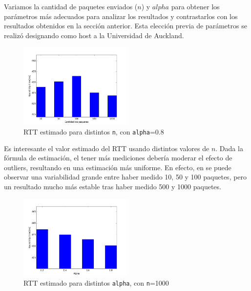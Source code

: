 \documentclass[final,inline,a4paper,narroweqnarray]{ieee}
\begin{document}
Variamos la cantidad de paquetes enviados ($n$) y $alpha$ para obtener los
parámetros más adecuados para analizar los resultados y contrastarlos con los
resultados obtenidos en la sección anterior. Esta elección previa de parámetros
se realizó designando como host a la Universidad de Auckland.

\begin{figure}[ht]\begin{center}
   \includegraphics[width=0.5\textwidth]{imagenes/auckland-estimate-alpha-08.png}
    \caption{RTT estimado para distintos \texttt{n}, con \texttt{alpha}=0.8}
    \label{auckland-estimate-alpha-08}
\end{center}\end{figure}

Es interesante el valor estimado del RTT usando distintos valores de $n$. Dada la fórmula de estimación, el tener más mediciones debería moderar el efecto de outliers, resultando en una estimación más uniforme.
En efecto, en  se puede observar una variabilidad grande entre haber medido 10, 50 y 100 paquetes, pero un resultado mucho más estable tras haber medido 500 y 1000 paquetes.

\begin{figure}[ht]\begin{center}
   \includegraphics[width=0.5\textwidth]{imagenes/auckland-estimate-n-1000.png}
    \caption{RTT estimado para distintos \texttt{alpha}, con \texttt{n}=1000}
    \label{fig:auckland-estimate-n-1000}
\end{center}\end{figure}
\end{document}
